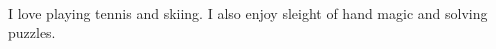 \documentclass[9pt]{resume}
\begin{document}
    \vspace{0.4cm}
        
        

    \vspace{-0.2cm}\\
        I love playing tennis and skiing. I also enjoy sleight of hand magic and solving puzzles. 
\end{document}
